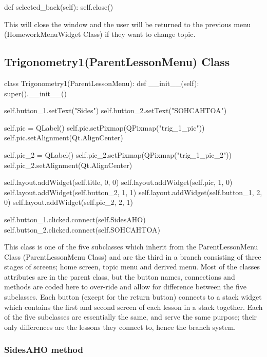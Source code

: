 \begin{python}
def selected_back(self):
	self.close()
\end{python}

This will close the window and the user will be returned to the previous menu (HomeworkMenuWidget Class) if they want to change topic.

\subsection{Trigonometry1(ParentLessonMenu) Class}

\begin{python}
class Trigonometry1(ParentLessonMenu):
    def __init__(self):
        super().__init__()

        self.button_1.setText("Sides")
        self.button_2.setText("SOHCAHTOA")

        self.pic = QLabel()
        self.pic.setPixmap(QPixmap("trig_1_pic"))
        self.pic.setAlignment(Qt.AlignCenter)

        self.pic_2 = QLabel()
        self.pic_2.setPixmap(QPixmap("trig_1_pic_2"))
        self.pic_2.setAlignment(Qt.AlignCenter)

        self.layout.addWidget(self.title, 0, 0)
        self.layout.addWidget(self.pic, 1, 0)
        self.layout.addWidget(self.button_2, 1, 1)
        self.layout.addWidget(self.button_1, 2, 0)
        self.layout.addWidget(self.pic_2, 2, 1)

        self.button_1.clicked.connect(self.SidesAHO)
        self.button_2.clicked.connect(self.SOHCAHTOA)
\end{python}

This class is one of the five subclasses which inherit from the ParentLessonMenu Class (ParentLessonMenu Class) and are the third in a branch consisting of three stages of screens; home screen, topic menu and derived menu. Most of the classes attributes are in the parent class, but the button names, connections and methods are coded here to over-ride and allow for difference between the five subclasses. Each button (except for the return button) connects to a stack widget which contains the first and second screen of each lesson in a stack together. Each of the five subclasses are essentially the same, and serve the same purpose; their only differences are the lessons they connect to, hence the branch system.

\subsubsection{SidesAHO method}

